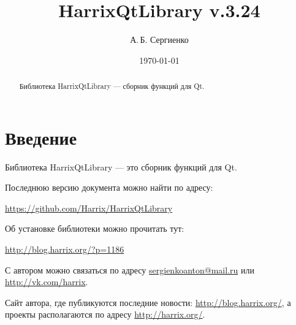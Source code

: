 \documentclass[a4paper,12pt]{article}
\title{HarrixQtLibrary v.3.24}
\author{А.\,Б. Сергиенко}
\date{\today}
\begin{document}


\maketitle

\begin{abstract}
Библиотека HarrixQtLibrary --- сборник функций для Qt.
\end{abstract}

\tableofcontents

\newpage

\section{Введение}

Библиотека HarrixQtLibrary --- это сборник функций для Qt.

Последнюю версию документа можно найти по адресу:

\href{https://github.com/Harrix/HarrixQtLibrary}{https://github.com/Harrix/HarrixQtLibrary}

Об установке библиотеки можно прочитать тут:

\href{http://blog.harrix.org/?p=1186}{http://blog.harrix.org/?p=1186}

С автором можно связаться по адресу \href{mailto:sergienkoanton@mail.ru}{sergienkoanton@mail.ru} или  \href{http://vk.com/harrix}{http://vk.com/harrix}.

Сайт автора, где публикуются последние новости: \href{http://blog.harrix.org/}{http://blog.harrix.org/}, а проекты располагаются по адресу \href{http://harrix.org/}{http://harrix.org/}.

\newpage
\end{document}
